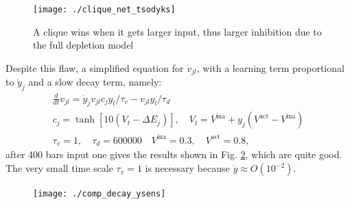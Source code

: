 \documentclass[10pt,a4paper]{article}
\begin{document}
		\begin{figure}
			\centering
			\texttt{[image: ./clique\_net\_tsodyks]}
			\label{fig:clique_net_tsodyks}
			\caption{A clique wins when it gets larger input, thus larger inhibition due to the full depletion model}
		\end{figure}
		
		Despite this flaw, a simplified equation for $\dot{v}_{jl}$, with a learning term proportional to $\dot{y}_j$ and a slow decay term, namely:
		\begin{gather}
		\frac{d}{dt} v_{jl} = \dot{y}_j v_{jl} c_j y_l / \tau_v  - v_{jl} y_l / \tau_d\\
		c_j = \tanh{\left[10 \left(V_t - \Delta E_j \right)\right]}, \quad V_t = V^{\text{ina}} + y_j \left(V^{\text{act}} - V^{\text{ina}}\right) \\ 
		\tau_v = 1, \quad \tau_d = 600 000 \quad V^{\text{ina}} = 0.3, \quad V^{\text{act}} = 0.8,	
		\end{gather}
		after 400 bars input one gives the results shown in Fig. \ref{fig:comp_decay_ysens}, which are quite good.
		The very small time scale $\tau_v = 1$ is necessary because $\dot{y} \approx O\left(10^{-2}\right)$.
		
		\begin{figure}
			\centering
			\texttt{[image: ./comp\_decay\_ysens]}
			\label{fig:comp_decay_ysens}
			\caption{}
		\end{figure}
		
\end{document}
